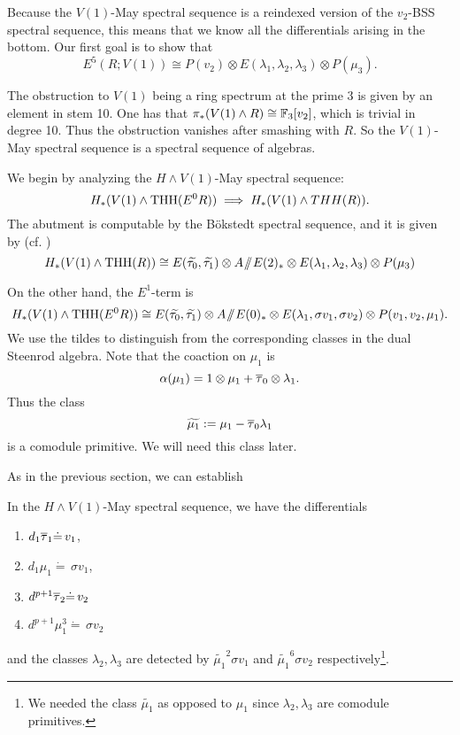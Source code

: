 Because the $V(1)$-May spectral sequence is a reindexed version of the $v_2$-BSS spectral sequence, this means that we know all the differentials arising in the bottom. Our first goal is to show that 
\[
E^5(R;V(1))\cong P(v_2)\otimes E(\lambda_1, \lambda_2, \lambda_3)\otimes P(\mu_3).
\]

\begin{rmk}
	The obstruction to $V(1)$ being a ring spectrum at the prime 3 is given by an element in stem 10. One has that $\pi_*(V(1)\wedge R)\cong \mathbb{F}_3[v_2]$, which is trivial in degree 10. Thus the obstruction vanishes after smashing with $R$. So the $V(1)$-May spectral sequence is a spectral sequence of algebras. 
\end{rmk}

We begin by analyzing the $H\wedge V(1)$-May spectral sequence:
\[
H_*(V(1)\wedge \operatorname{THH}(E^0R))\implies H_*(V(1)\wedge THH(R)).
\]
The abutment is computable by the B\"okstedt spectral sequence, and it is given by (cf. \cite{AngeltveitRognes})
\[
H_*(V(1)\wedge \operatorname{THH}(R))\cong E(\widetilde{\tau_0}, \widetilde{\tau_1})\otimes A\! \sslash \! E(2)_*\otimes E(\lambda_1,\lambda_2, \lambda_3)\otimes P(\mu_3)
\]

On the other hand, the $E^1$-term is 
\[
H_*(V(1)\wedge \operatorname{THH}(E^0R))\cong E(\widetilde{\tau_0}, \widetilde{\tau_1})\otimes A\! \sslash \! E(0)_*\otimes E(\lambda_1, \sigma v_1,\sigma v_2)\otimes P(v_1,v_2, \mu_1).
\]
We use the tildes to distinguish from the corresponding classes in the dual Steenrod algebra. Note that the coaction on $\mu_1$ is 
\[
\alpha(\mu_1) = 1\otimes \mu_1+\overline{\tau}_0\otimes \lambda_1.
\]
Thus the class
\[
\widetilde{\mu_1}:= \mu_1-\overline{\tau}_0\lambda_1
\]
is a comodule primitive. We will need this class later. 

 As in the previous section, we can establish

\begin{prop}
	In the $H\wedge V(1)$-May spectral sequence, we have the differentials 
	\begin{enumerate}
		\item $d_1\overline{\tau}_1\dot{=}\, v_1$,
		\item $d_1\mu_1\dot{=}\, \sigma v_1$,
		\item $d^{p+1}\overline{\tau}_2\dot{=}\, v_2$
		\item $d^{p+1}\mu_1^3\dot{=}\, \sigma v_2$
	\end{enumerate}
and the classes $\lambda_2, \lambda_3$ are detected by $\widetilde{\mu_1}^2\sigma v_1$ and $\widetilde{\mu_1}^6\sigma v_2$ respectively\footnote{We needed the class $\widetilde{\mu_1}$ as opposed to $\mu_1$ since $\lambda_2, \lambda_3$ are comodule primitives.}.
\end{prop}

